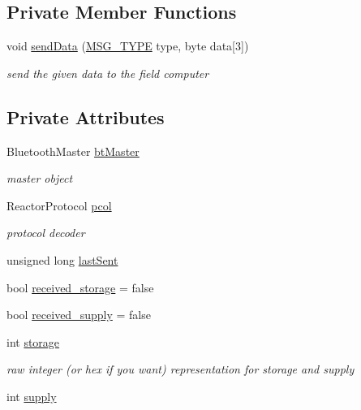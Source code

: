 \subsection*{Private Member Functions}
\begin{DoxyCompactItemize}
\item 
void \hyperlink{classBTClient_a0561b17912b37892d4f4226d1769f7e8}{send\-Data} (\hyperlink{classBTClient_aa4e607f3ba1fea67548e2c2864915cb8}{M\-S\-G\-\_\-\-T\-Y\-P\-E} type, byte data\mbox{[}3\mbox{]})
\begin{DoxyCompactList}\small\item\em send the given data to the field computer \end{DoxyCompactList}\end{DoxyCompactItemize}
\subsection*{Private Attributes}
\begin{DoxyCompactItemize}
\item 
Bluetooth\-Master \hyperlink{classBTClient_a5376be2a850c64faab1e9a02adcd342b}{bt\-Master}
\begin{DoxyCompactList}\small\item\em master object \end{DoxyCompactList}\item 
Reactor\-Protocol \hyperlink{classBTClient_a64bd4b5e464d0b6a57957428ef559142}{pcol}
\begin{DoxyCompactList}\small\item\em protocol decoder \end{DoxyCompactList}\item 
unsigned long \hyperlink{classBTClient_a946cc60b431ec813642b97b0c4b76cf3}{last\-Sent}
\item 
bool \hyperlink{classBTClient_a41a7d3382ab8bbdf4b7d78b7b69ff85f}{received\-\_\-storage} = false
\item 
bool \hyperlink{classBTClient_af00b18b695ecc4bdeea133572eb0fd6d}{received\-\_\-supply} = false
\item 
int \hyperlink{classBTClient_a5ba419e7e6be73f5ec26f6b6c8d4ccf1}{storage}
\begin{DoxyCompactList}\small\item\em raw integer (or hex if you want) representation for storage and supply \end{DoxyCompactList}\item 
int \hyperlink{classBTClient_a3974a28859432eeef27cfd7391ed7d60}{supply}
\end{DoxyCompactItemize}


